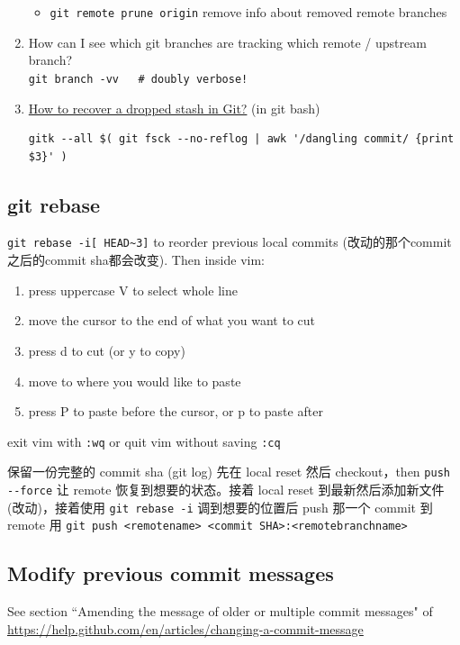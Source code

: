 \documentclass[a4paper, 12pt]{article}
\begin{document}
\begin{enumerate}
\begin{itemize}
\item \verb|git remote prune origin| remove info about removed remote branches
\end{itemize}

\item How can I see which git branches are tracking which remote / upstream branch?\\
\verb|git branch -vv   # doubly verbose!|

\item \href{https://stackoverflow.com/questions/89332/how-to-recover-a-dropped-stash-in-git}{How to recover a dropped stash in Git?} (in git bash)
\begin{verbatim}
gitk --all $( git fsck --no-reflog | awk '/dangling commit/ {print $3}' )
\end{verbatim}

\end{enumerate}

\subsection{git rebase}
\verb|git rebase -i[ HEAD~3]| to reorder previous local commits (改动的那个commit之后的commit sha都会改变). Then inside vim:
\begin{enumerate}
\item press uppercase V to select whole line
\item move the cursor to the end of what you want to cut
\item press d to cut (or y to copy)
\item move to where you would like to paste
\item press P to paste before the cursor, or p to paste after
\end{enumerate}

exit vim with \verb|:wq| or quit vim without saving \verb|:cq|

{\color{red}保留一份完整的 commit sha (git log)} 先在 local reset 然后 checkout，then \verb|push --force| 让 remote 恢复到想要的状态。接着 local reset 到最新然后添加新文件(改动)，接着使用 \verb|git rebase -i| 调到想要的位置后 push 那一个 commit 到 remote 用 \verb|git push <remotename> <commit SHA>:<remotebranchname>|

\subsection{Modify previous commit messages}
See section ``Amending the message of older or multiple commit messages" of \url{https://help.github.com/en/articles/changing-a-commit-message}
\end{document}
